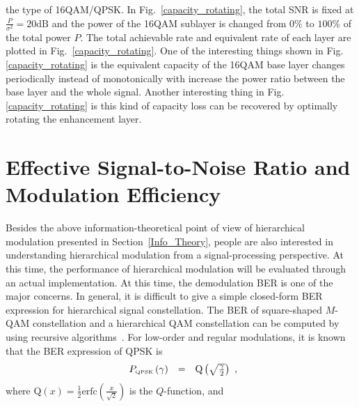 \documentclass[10pt,fleqn, twocolumn]{IEEEtran}
\begin{document}
the type of 16QAM/QPSK. In Fig.~\ref{capacity_rotating}, the total
SNR is fixed at $\frac{P}{\sigma^2}=20\mbox{dB}$ and the power of
the 16QAM sublayer is changed from $0\%$ to $100\%$ of the total
power $P$. The total achievable rate and equivalent rate of each
layer are plotted in Fig.~\ref{capacity_rotating}. One of the
interesting things shown in Fig. \ref{capacity_rotating} is the
equivalent capacity of the 16QAM base layer changes periodically
instead of monotonically with increase the power ratio between the
base layer and the whole signal. Another interesting thing in Fig.
\ref{capacity_rotating} is this kind of capacity loss can be
recovered by optimally rotating the enhancement layer.
\begin{figure}
\end{figure}
\section{Effective Signal-to-Noise Ratio and Modulation Efficiency}
Besides the above information-theoretical point of view of
hierarchical modulation presented in Section~\ref{Info_Theory},
people are also interested in understanding hierarchical
modulation from a signal-processing perspective. At this time, the
performance of hierarchical modulation will be evaluated through
an actual implementation. At this time, the demodulation BER is
one of the major concerns. In general, it is difficult to give a
simple closed-form BER expression for hierarchical signal
constellation. The BER of square-shaped $M$-QAM constellation and
a hierarchical QAM constellation can be computed by using
recursive algorithms~\cite{Vitt03}. For low-order and regular
modulations, it is known that the BER expression of QPSK is
\begin{equation}
\begin{array}{rcl}
P_{\mbox{\tiny
QPSK}}\left(\gamma\right)&=&\mbox{Q}\left(\sqrt{\frac{\gamma}{2}}\right)
\end{array},\label{BER_QPSK}
\end{equation}
\noindent where
$\mbox{Q}\left(x\right)=\frac{1}{2}\mbox{erfc}\left(\frac{x}{\sqrt{2}}\right)$
is the $Q$-function, and
\end{document}
